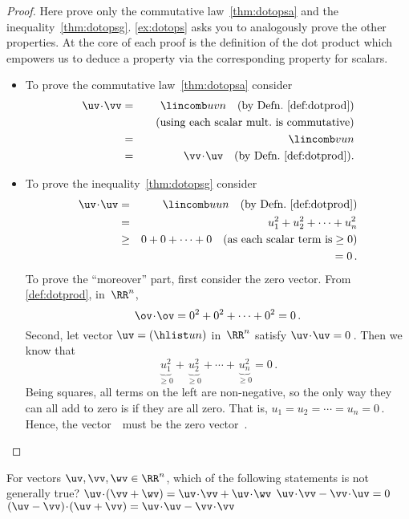\begin{proof} 
Here prove only the commutative law~\ref{thm:dotopsa} and the inequality~\ref{thm:dotopsg}.
\autoref{ex:dotops} asks you to analogously prove the other properties.
At the core of each proof is the definition of the dot product which empowers us to deduce a property via the corresponding property for scalars.
\begin{itemize}
\item To prove the commutative law~\ref{thm:dotopsa} consider
\begin{eqnarray*}
\uv\cdot\vv&=&\lincomb uvn \quad(\text{by Defn.~\ref{def:dotprod}})
\\&&\quad(\text{using each scalar mult.\ is commutative})
\\&=&\lincomb vun
\\&=&\vv\cdot\uv \quad(\text{by Defn.~\ref{def:dotprod}}).
\end{eqnarray*}

\item To prove the inequality~\ref{thm:dotopsg} consider
\begin{eqnarray*}
\uv\cdot\uv&=&\lincomb uun\quad(\text{by Defn.~\ref{def:dotprod}})
\\&=&u_1^2+u_2^2+\cdots+u_n^2
\\&\geq&0+0+\cdots+0 \quad(\text{as each scalar term is}\geq0)
\\&&{}=0\,.
\end{eqnarray*}
To prove the ``moreover'' part, first consider the zero vector.
From \autoref{def:dotprod}, in~\(\RR^n\),
\begin{equation*}
\ov\cdot\ov={0^2+0^2+\cdots+0^2}=0\,.
\end{equation*}
Second, let vector \(\uv=(\hlist un)\) in~\(\RR^n\) satisfy \(\uv\cdot\uv=0\)\,.
Then we know that
\begin{equation*}
\underbrace{u_1^2}_{\geq0}+\underbrace{u_2^2}_{\geq0}
+\cdots+\underbrace{u_n^2}_{\geq0}=0\,.
\end{equation*}
Being squares, all terms on the left are non-negative, so the only way they can all add to zero is if they are all zero.
That is, \(u_1=u_2=\cdots=u_n=0\)\,.
Hence, the vector~\uv\ must be the zero vector~\ov.
\end{itemize}
\end{proof}



\begin{activity}
For vectors \(\uv,\vv,\wv\in\RR^n\), which of the following statements is not generally true?
{\(\uv\cdot(\vv+\wv)=\uv\cdot\vv+\uv\cdot\wv\)}
{\(\uv\cdot\vv-\vv\cdot\uv=0\)}
{\((\uv-\vv)\cdot(\uv+\vv)=\uv\cdot\uv-\vv\cdot\vv\)}
\end{activity}



